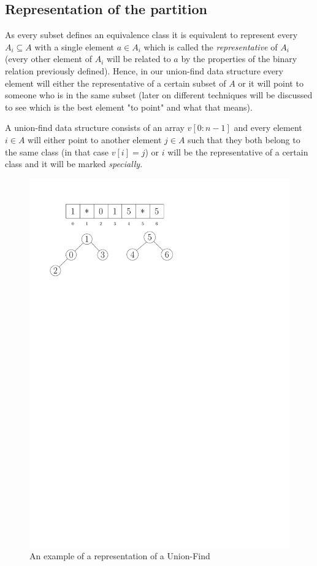 \subsection{Representation of the partition}
As every subset defines an equivalence class it is equivalent to represent every $A_i \subseteq A$ with a single element $a \in A_i$ which is called the \textit{representative} of $A_i$ (every other element of $A_i$ will be related to $a$ by the properties of the binary relation previously defined). Hence, in our union-find data structure every element will either the representative of a certain subset of $A$ or it will point to someone who is in the same subset (later on different techniques will be discussed to see which is the best element "to point" and what that means). 

A union-find data structure consists of an array $v[0:n-1]$ and every element $i \in A$ will either point to another element $j \in A$ such that they both belong to the same class (in that case $v[i] = j$) or $i$ will be the representative of a certain class and it will be marked \textit{specially}.

\begin{figure}
    \centering
    \includegraphics[scale=0.75]{images/ufExample.pdf}
    \caption{An example of a representation of a Union-Find}
\end{figure}
